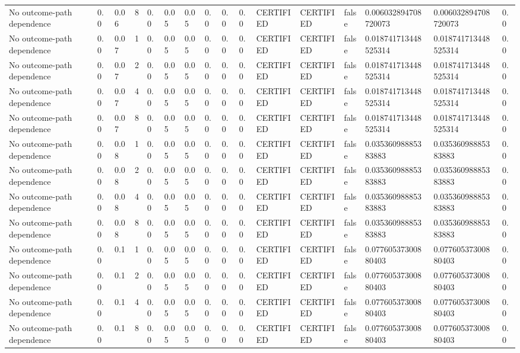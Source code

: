 \begin{tabular}{llllllllllllllll}
No outcome-path dependence & 0.0 & 0.06 & 8 & 0.0 & 0.05 & 0.05 & 0.0 & 0.0 & 0.0 & CERTIFIED & CERTIFIED & false & 0.006032894708720073 & 0.006032894708720073 & 0.0 \\
No outcome-path dependence & 0.0 & 0.07 & 1 & 0.0 & 0.05 & 0.05 & 0.0 & 0.0 & 0.0 & CERTIFIED & CERTIFIED & false & 0.018741713448525314 & 0.018741713448525314 & 0.0 \\
No outcome-path dependence & 0.0 & 0.07 & 2 & 0.0 & 0.05 & 0.05 & 0.0 & 0.0 & 0.0 & CERTIFIED & CERTIFIED & false & 0.018741713448525314 & 0.018741713448525314 & 0.0 \\
No outcome-path dependence & 0.0 & 0.07 & 4 & 0.0 & 0.05 & 0.05 & 0.0 & 0.0 & 0.0 & CERTIFIED & CERTIFIED & false & 0.018741713448525314 & 0.018741713448525314 & 0.0 \\
No outcome-path dependence & 0.0 & 0.07 & 8 & 0.0 & 0.05 & 0.05 & 0.0 & 0.0 & 0.0 & CERTIFIED & CERTIFIED & false & 0.018741713448525314 & 0.018741713448525314 & 0.0 \\
No outcome-path dependence & 0.0 & 0.08 & 1 & 0.0 & 0.05 & 0.05 & 0.0 & 0.0 & 0.0 & CERTIFIED & CERTIFIED & false & 0.03536098885383883 & 0.03536098885383883 & 0.0 \\
No outcome-path dependence & 0.0 & 0.08 & 2 & 0.0 & 0.05 & 0.05 & 0.0 & 0.0 & 0.0 & CERTIFIED & CERTIFIED & false & 0.03536098885383883 & 0.03536098885383883 & 0.0 \\
No outcome-path dependence & 0.0 & 0.08 & 4 & 0.0 & 0.05 & 0.05 & 0.0 & 0.0 & 0.0 & CERTIFIED & CERTIFIED & false & 0.03536098885383883 & 0.03536098885383883 & 0.0 \\
No outcome-path dependence & 0.0 & 0.08 & 8 & 0.0 & 0.05 & 0.05 & 0.0 & 0.0 & 0.0 & CERTIFIED & CERTIFIED & false & 0.03536098885383883 & 0.03536098885383883 & 0.0 \\
No outcome-path dependence & 0.0 & 0.1 & 1 & 0.0 & 0.05 & 0.05 & 0.0 & 0.0 & 0.0 & CERTIFIED & CERTIFIED & false & 0.07760537300880403 & 0.07760537300880403 & 0.0 \\
No outcome-path dependence & 0.0 & 0.1 & 2 & 0.0 & 0.05 & 0.05 & 0.0 & 0.0 & 0.0 & CERTIFIED & CERTIFIED & false & 0.07760537300880403 & 0.07760537300880403 & 0.0 \\
No outcome-path dependence & 0.0 & 0.1 & 4 & 0.0 & 0.05 & 0.05 & 0.0 & 0.0 & 0.0 & CERTIFIED & CERTIFIED & false & 0.07760537300880403 & 0.07760537300880403 & 0.0 \\
No outcome-path dependence & 0.0 & 0.1 & 8 & 0.0 & 0.05 & 0.05 & 0.0 & 0.0 & 0.0 & CERTIFIED & CERTIFIED & false & 0.07760537300880403 & 0.07760537300880403 & 0.0 \\

\end{tabular}
